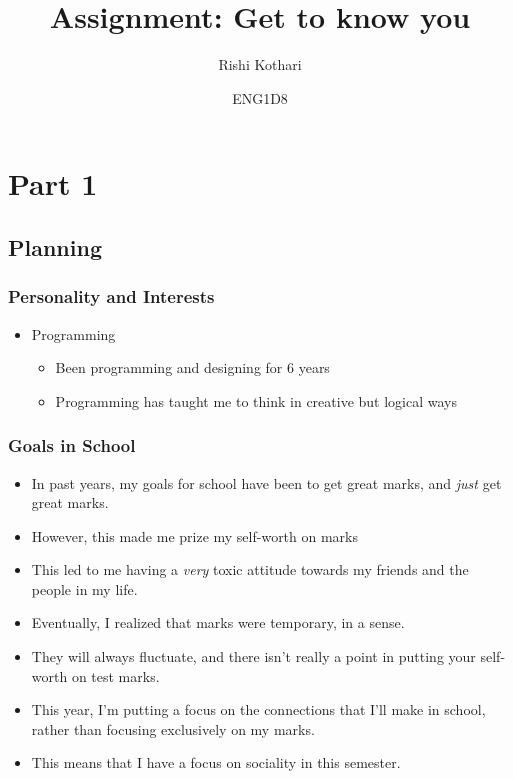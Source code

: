 \documentclass[]{article}
\title{\Huge Assignment: \textbf{Get to know you}}
\author{\LARGE Rishi Kothari}
\date{ENG1D8}
\begin{document}
\maketitle

\newpage


\section*{Part 1}
\subsection*{Planning}
\subsubsection*{Personality and Interests}
\begin{itemize}
    \item Programming
    \begin{itemize}
        \item Been programming and designing for 6 years
        \item Programming has taught me to think in creative but logical ways
    \end{itemize}
\end{itemize}
\subsubsection*{Goals in School}
\begin{itemize}
    \item In past years, my goals for school have been to get great marks, and \textit{just} get great marks.
    \item However, this made me prize my self-worth on marks
    \item This led to me having a \textit{very} toxic attitude towards my friends and the people in my life.
    \item Eventually, I realized that marks were temporary, in a sense.
    \item They will always fluctuate, and there isn't really a point in putting your self-worth on test marks.
    \item This year, I'm putting a focus on the connections that I'll make in school, rather than focusing exclusively on my marks.
    \item This means that I have a focus on sociality in this semester.
\end{itemize}
\end{document}
